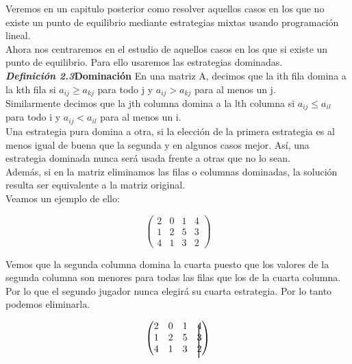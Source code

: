 \documentclass[10pt,a4paper]{book}
\begin{document}
Veremos en un capitulo posterior como resolver aquellos casos en los que no existe un punto de equilibrio mediante estrategias mixtas usando programación lineal. \\
Ahora nos centraremos en el estudio de aquellos casos en los que si existe un punto de equilibrio. Para ello usaremos las estrategias dominadas.\\



\textit{\textbf{Definición 2.3}}\textbf{Dominación} En una matriz A, decimos que la ith fila domina a la kth fila si $a_{ij} \geq a_{kj}$ para todo j y  $a_{ij} > a_{kj}$ para al menos un j.\\
Similarmente decimos que la jth columna domina a la lth columna si $a_{ij} \leq a_{il}$ para todo i y  $a_{ij} < a_{il}$ para al menos un i.\\

Una estrategia pura domina a otra, si la elección de la primera estrategia es al menos igual de buena que la segunda y en algunos casos mejor. Así, una estrategia dominada nunca será usada frente a otras que no lo sean. \\
Además, si en la matriz eliminamos las filas o columnas dominadas, la solución resulta ser equivalente a la matriz original.\\

Veamos un ejemplo de ello:


\begin{equation}
	\begin{pmatrix}
		2 & 0 & 1 & 4\\
		1 & 2 & 5 & 3\\
		4 & 1 & 3 & 2
	\end{pmatrix}
\end{equation} 

Vemos que la segunda columna domina la cuarta puesto que los valores de la segunda columna son menores para todas las filas que los de la cuarta columna. Por lo que el segundo jugador nunca elegirá su cuarta estrategia. Por lo tanto podemos eliminarla.


\begin{equation}
	\begin{pmatrix}
		2 & 0 & 1 & 4\\
		1 & 2 & 5 & 3\\
		4 & 1 & 3 & 2
		\makebox(-6,0){\rule[5ex]{.8pt}{8ex}} %

	\end{pmatrix}
\end{equation} 
\end{document}
